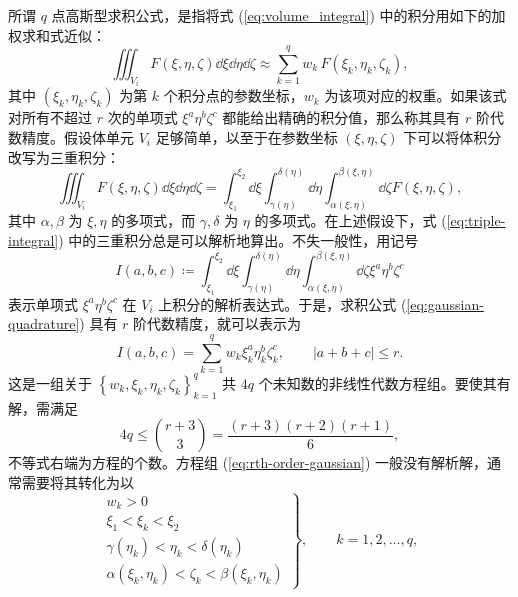 所谓 $q$ 点高斯型求积公式，是指将式 (\ref{eq:volume_integral}) 中的积分用如下的加权求和式近似：
\begin{equation}
\iiint_{V_{i}}F(\xi,\eta,\zeta)\dd{\xi}\dd{\eta}\dd{\zeta}\approx\sum_{k=1}^{q}w_{k}\,F(\xi_{k},\eta_{k},\zeta_{k}),\label{eq:gaussian-quadrature}
\end{equation}
其中 $(\xi_{k},\eta_{k},\zeta_{k})$ 为第 $k$ 个积分点的参数坐标，$w_{k}$ 为该项对应的权重。如果该式对所有不超过
$r$ 次的单项式 $\xi^{a}\eta^{b}\zeta^{c}$ 都能给出精确的积分值，那么称其具有 $r$ 阶代数精度。假设体单元
$V_{i}$ 足够简单，以至于在参数坐标 $(\xi,\eta,\zeta)$ 下可以将体积分改写为三重积分：
\begin{equation}
\iiint_{V_{i}}F(\xi,\eta,\zeta)\dd{\xi}\dd{\eta}\dd{\zeta}=\int_{\xi_{1}}^{\xi_{2}}\dd{\xi}\int_{\gamma(\eta)}^{\delta(\eta)}\dd{\eta}\int_{\alpha(\xi,\eta)}^{\beta(\xi,\eta)}\dd{\zeta}F(\xi,\eta,\zeta),\label{eq:triple-integral}
\end{equation}
其中 $\alpha,\beta$ 为 $\xi,\eta$ 的多项式，而 $\gamma,\delta$ 为 $\eta$
的多项式。在上述假设下，式 (\ref{eq:triple-integral}) 中的三重积分总是可以解析地算出。不失一般性，用记号
\begin{equation}
I(a,b,c)\coloneqq\int_{\xi_{1}}^{\xi_{2}}\dd{\xi}\int_{\gamma(\eta)}^{\delta(\eta)}\dd{\eta}\int_{\alpha(\xi,\eta)}^{\beta(\xi,\eta)}\dd{\zeta}\xi^{a}\eta^{b}\zeta^{c}
\end{equation}
表示单项式 $\xi^{a}\eta^{b}\zeta^{c}$ 在 $V_{i}$ 上积分的解析表达式。于是，求积公式 (\ref{eq:gaussian-quadrature})
具有 $r$ 阶代数精度，就可以表示为
\begin{equation}
I(a,b,c)=\sum_{k=1}^{q}w_{k}\xi_{k}^{a}\eta_{k}^{b}\zeta_{k}^{c},\qquad\vert a+b+c\vert\le r.\label{eq:rth-order-gaussian}
\end{equation}
这是一组关于 $\left\{ w_{k},\xi_{k},\eta_{k},\zeta_{k}\right\} _{k=1}^{q}$
共 $4q$ 个未知数的非线性代数方程组。要使其有解，需满足
\begin{equation}
4q\le\binom{r+3}{3}=\frac{(r+3)(r+2)(r+1)}{6},
\end{equation}
不等式右端为方程的个数。方程组 (\ref{eq:rth-order-gaussian}) 一般没有解析解，通常需要将其转化为以
\begin{equation}
\left.\begin{array}{c}
w_{k}>0\\
\xi_{1}<\xi_{k}<\xi_{2}\\
\gamma(\eta_{k})<\eta_{k}<\delta(\eta_{k})\\
\alpha(\xi_{k},\eta_{k})<\zeta_{k}<\beta(\xi_{k},\eta_{k})
\end{array}\right\} ,\qquad k=1,2,\dots,q,
\end{equation}
